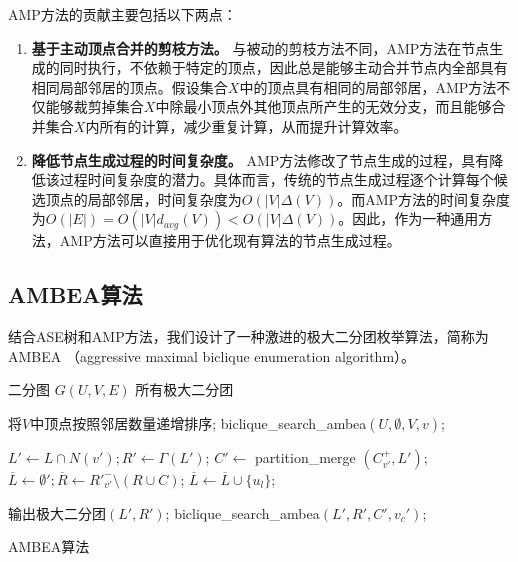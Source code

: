 AMP方法的贡献主要包括以下两点：

\begin{enumerate}
  \item \textbf{基于主动顶点合并的剪枝方法。} 与被动的剪枝方法不同，AMP方法在节点生成的同时执行，不依赖于特定的顶点，因此总是能够主动合并节点内全部具有相同局部邻居的顶点。假设集合$X$中的顶点具有相同的局部邻居，AMP方法不仅能够裁剪掉集合$X$中除最小顶点外其他顶点所产生的无效分支，而且能够合并集合$X$内所有的计算，减少重复计算，从而提升计算效率。
  
  \item \textbf{降低节点生成过程的时间复杂度。} AMP方法修改了节点生成的过程，具有降低该过程时间复杂度的潜力。具体而言，传统的节点生成过程逐个计算每个候选顶点的局部邻居，时间复杂度为$O(|V|\Delta(V))$。而AMP方法的时间复杂度为$O(|E|) =O(|V|d_{avg}(V)) < O(|V|\Delta(V))$。因此，作为一种通用方法，AMP方法可以直接用于优化现有算法的节点生成过程。

\end{enumerate}

\subsection{AMBEA算法}
\label{subsec:ambea}
  结合ASE树和AMP方法，我们设计了一种激进的极大二分团枚举算法，简称为AMBEA （aggressive maximal biclique enumeration algorithm）。

\begin{algorithm}[H]
  \begin{algorithmic}[1]
    \normalsize
    \REQUIRE 二分图 $G(U,V,E)$
    \ENSURE 所有极大二分团
    
    \renewcommand{\algorithmicwhile}{\textbf{procedure}}
    \renewcommand{\algorithmicdo}{\textbf{:}}

    \STATE 将$V$中顶点按照邻居数量递增排序;
      \STATE \textsf{biclique\_search\_ambea}$(U,\emptyset,V,v)$;
    \ENDFOR

    \renewcommand{\algorithmicdo}{\textbf{do}}
      \STATE $L' \leftarrow L \cap N(v'); R' \leftarrow \Gamma(L')$;
      \STATE $C' \leftarrow$ \textsf{partition\_merge}    $(C_{v'}^+, L')$;
      \STATE $\overline{L} \leftarrow \emptyset'; \overline{R}\leftarrow {R'}_{v'}^- \setminus (R \cup C)$;
          \STATE $\overline{L} \leftarrow \overline{L} \cup \{u_l\}$;
        \ENDIF
      \ENDFOR

        \STATE 输出极大二分团$(L', R')$;
            \STATE \textsf{biclique\_search\_ambea}$(L', R', C', v_c')$;
          \ENDIF
        \ENDFOR
      \ENDIF
    \ENDWHILE

  \end{algorithmic}
  \caption{AMBEA算法}
  \label{alg:ambea}
\end{algorithm}

